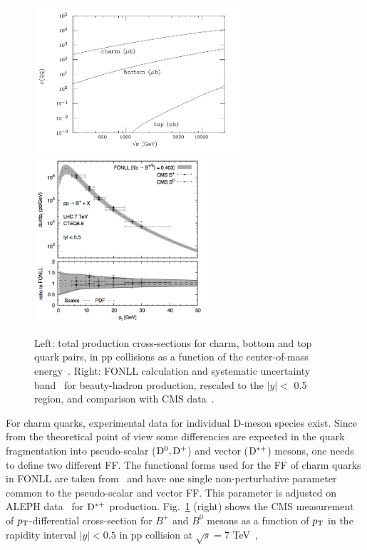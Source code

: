 \begin{figure}[!ht]
  \centering
  \includegraphics[width=7.6cm]{FigCap2/HQxsecPPcoll.png}
      \includegraphics[width=6.4cm]{FigCap2/FONLLBmeson.png}
  \caption{Left: total production cross-sections for charm, bottom and top quark pairs, in pp collisions as a function of the center-of-mass energy~\cite{Mangano:1997ri}. Right: FONLL calculation and systematic uncertainty band~\cite{Cacciari:2012ny} for beauty-hadron production, rescaled to the $|y| <$ 0.5 region, and comparison with CMS data~\cite{Khachatryan:2011mk,Chatrchyan:2011pw}.}
  \label{fig:HQxsecPPcoll}
\end{figure}
For charm quarks, experimental data for individual D-meson species exist.
Since from the theoretical point of view some differencies are 
expected in the quark fragmentation into 
pseudo-scalar (${\rm D^0}, {\rm D^+}$) and vector (${\rm D^{*+}}$) mesons, 
one needs to define two different FF. The functional forms used for
the FF of charm quarks in FONLL are taken from~\cite{Cacciari:2003zu}
and have one single non-perturbative parameter
common to the pseudo-scalar and vector FF. This parameter is adjusted on
ALEPH data~\cite{Barate:1999bg} for ${\rm D^{*+}}$ production.
Fig.~\ref{fig:HQxsecPPcoll} (right) shows the CMS measurement 
of $p_{\rm T}$-differential cross-section for $B^+$ and $B^0$ mesons
as a function of $p_{\rm T}$ in the rapidity interval $|y| < 0.5$ in pp collision 
at $\sqrt{s} = 7$ TeV~\cite{Khachatryan:2011mk,Chatrchyan:2011pw}, 
